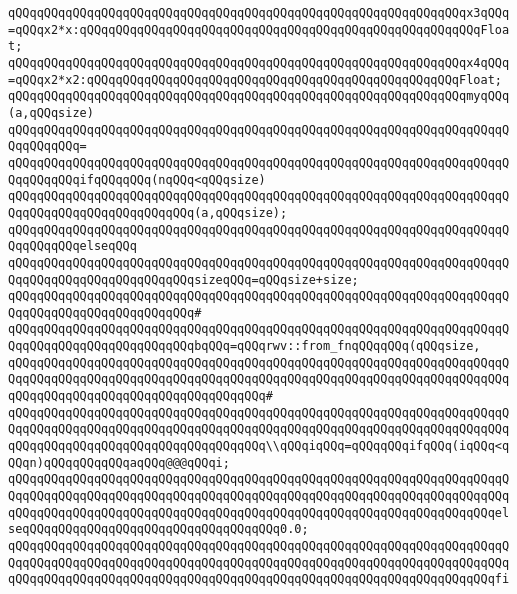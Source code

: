 \verb|qQQqqQQqqQQqqQQqqQQqqQQqqQQqqQQqqQQqqQQqqQQqqQQqqQQqqQQqqQQqqQQqx3qQQq=qQQqx2*x:qQQqqQQqqQQqqQQqqQQqqQQqqQQqqQQqqQQqqQQqqQQqqQQqqQQqqQQqFloat;|\newline
\verb|qQQqqQQqqQQqqQQqqQQqqQQqqQQqqQQqqQQqqQQqqQQqqQQqqQQqqQQqqQQqqQQqx4qQQq=qQQqx2*x2:qQQqqQQqqQQqqQQqqQQqqQQqqQQqqQQqqQQqqQQqqQQqqQQqqQQqFloat;|\newline
\newline
\verb|qQQqqQQqqQQqqQQqqQQqqQQqqQQqqQQqqQQqqQQqqQQqqQQqqQQqqQQqqQQqqQQqmyqQQq(a,qQQqsize)|\newline
\verb|qQQqqQQqqQQqqQQqqQQqqQQqqQQqqQQqqQQqqQQqqQQqqQQqqQQqqQQqqQQqqQQqqQQqqQQqqQQqqQQq=|\newline
\verb|qQQqqQQqqQQqqQQqqQQqqQQqqQQqqQQqqQQqqQQqqQQqqQQqqQQqqQQqqQQqqQQqqQQqqQQqqQQqqQQqifqQQqqQQq(nqQQq<qQQqsize)|\newline
\verb|qQQqqQQqqQQqqQQqqQQqqQQqqQQqqQQqqQQqqQQqqQQqqQQqqQQqqQQqqQQqqQQqqQQqqQQqqQQqqQQqqQQqqQQqqQQqqQQq(a,qQQqsize);|\newline
\verb|qQQqqQQqqQQqqQQqqQQqqQQqqQQqqQQqqQQqqQQqqQQqqQQqqQQqqQQqqQQqqQQqqQQqqQQqqQQqqQQqelseqQQq|\newline
\verb|qQQqqQQqqQQqqQQqqQQqqQQqqQQqqQQqqQQqqQQqqQQqqQQqqQQqqQQqqQQqqQQqqQQqqQQqqQQqqQQqqQQqqQQqqQQqqQQqsizeqQQq=qQQqsize+size;|\newline
\verb|qQQqqQQqqQQqqQQqqQQqqQQqqQQqqQQqqQQqqQQqqQQqqQQqqQQqqQQqqQQqqQQqqQQqqQQqqQQqqQQqqQQqqQQqqQQqqQQq#|\newline
\verb|qQQqqQQqqQQqqQQqqQQqqQQqqQQqqQQqqQQqqQQqqQQqqQQqqQQqqQQqqQQqqQQqqQQqqQQqqQQqqQQqqQQqqQQqqQQqqQQqbqQQq=qQQqrwv::from_fnqQQqqQQq(qQQqsize,|\newline
\verb|qQQqqQQqqQQqqQQqqQQqqQQqqQQqqQQqqQQqqQQqqQQqqQQqqQQqqQQqqQQqqQQqqQQqqQQqqQQqqQQqqQQqqQQqqQQqqQQqqQQqqQQqqQQqqQQqqQQqqQQqqQQqqQQqqQQqqQQqqQQqqQQqqQQqqQQqqQQqqQQqqQQqqQQqqQQqqQQq#|\newline
\verb|qQQqqQQqqQQqqQQqqQQqqQQqqQQqqQQqqQQqqQQqqQQqqQQqqQQqqQQqqQQqqQQqqQQqqQQqqQQqqQQqqQQqqQQqqQQqqQQqqQQqqQQqqQQqqQQqqQQqqQQqqQQqqQQqqQQqqQQqqQQqqQQqqQQqqQQqqQQqqQQqqQQqqQQqqQQqqQQq\\qQQqiqQQq=qQQqqQQqifqQQq(iqQQq<qQQqn)qQQqqQQqqQQqaqQQq@@@qQQqi;|\newline
\verb|qQQqqQQqqQQqqQQqqQQqqQQqqQQqqQQqqQQqqQQqqQQqqQQqqQQqqQQqqQQqqQQqqQQqqQQqqQQqqQQqqQQqqQQqqQQqqQQqqQQqqQQqqQQqqQQqqQQqqQQqqQQqqQQqqQQqqQQqqQQqqQQqqQQqqQQqqQQqqQQqqQQqqQQqqQQqqQQqqQQqqQQqqQQqqQQqqQQqqQQqqQQqqQQqelseqQQqqQQqqQQqqQQqqQQqqQQqqQQqqQQqqQQq0.0;|\newline
\verb|qQQqqQQqqQQqqQQqqQQqqQQqqQQqqQQqqQQqqQQqqQQqqQQqqQQqqQQqqQQqqQQqqQQqqQQqqQQqqQQqqQQqqQQqqQQqqQQqqQQqqQQqqQQqqQQqqQQqqQQqqQQqqQQqqQQqqQQqqQQqqQQqqQQqqQQqqQQqqQQqqQQqqQQqqQQqqQQqqQQqqQQqqQQqqQQqqQQqqQQqqQQqqQQqfi|\newline

